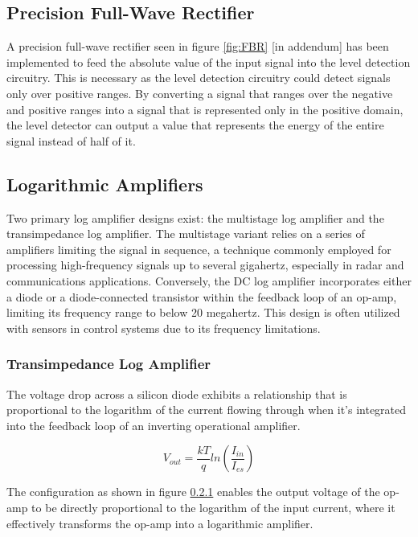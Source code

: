 \documentclass[10pt]{article}
\begin{document}
\begin{multicols*}{2}
            \subsection{Precision Full-Wave Rectifier}
                A precision full-wave rectifier seen in figure \ref{fig:FBR} [in addendum] has been implemented to feed the absolute value of the input signal into the level detection circuitry. This is necessary as the level detection circuitry could detect signals only over positive ranges. By converting a signal that ranges over the negative and positive ranges into a signal that is represented only in the positive domain, the level detector can output a value that represents the energy of the entire signal instead of half of it.
                
            \subsection{Logarithmic Amplifiers} \label{sect:log-amp}
                Two primary log amplifier designs exist: the multistage log amplifier and the transimpedance log amplifier. The multistage variant relies on a series of amplifiers limiting the signal in sequence, a technique commonly employed for processing high-frequency signals up to several gigahertz, especially in radar and communications applications. Conversely, the DC log amplifier incorporates either a diode or a diode-connected transistor within the feedback loop of an op-amp, limiting its frequency range to below 20 megahertz. This design is often utilized with sensors in control systems due to its frequency limitations.\par

                \subsubsection{Transimpedance Log Amplifier}
                    The voltage drop across a silicon diode exhibits a relationship that is proportional to the logarithm of the current flowing through when it's integrated into the feedback loop of an inverting operational amplifier. 
                    
                        \begin{equation}
                            V_{out}=\frac{kT}{q}ln(\frac{I_{in}}{I_{es}})
                        \end{equation}
                    
                    \noindent The configuration as shown in figure \ref{} enables the output voltage of the op-amp to be directly proportional to the logarithm of the input current, where it effectively transforms the op-amp into a logarithmic amplifier.\par


\end{multicols*}
\end{document}
